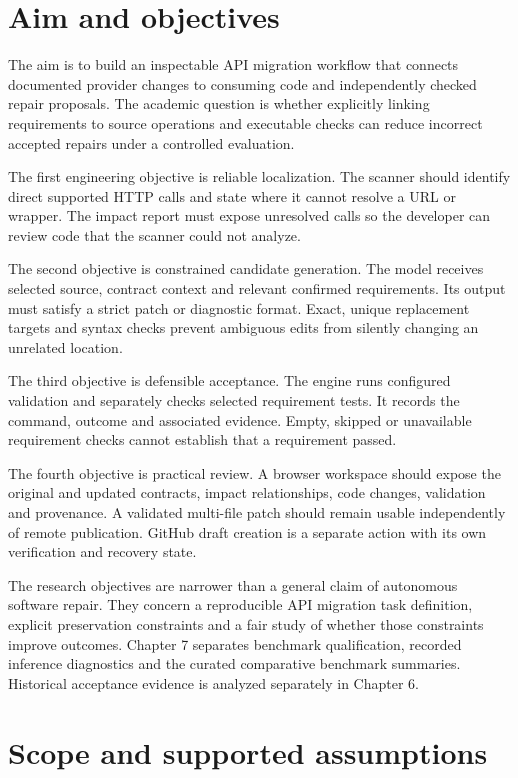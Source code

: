 \documentclass[12pt,a4paper,oneside]{report}
\begin{document}
\section{Aim and objectives}

The aim is to build an inspectable API migration workflow that connects documented provider changes to consuming code and independently checked repair proposals. The academic question is whether explicitly linking requirements to source operations and executable checks can reduce incorrect accepted repairs under a controlled evaluation.

The first engineering objective is reliable localization. The scanner should identify direct supported HTTP calls and state where it cannot resolve a URL or wrapper. The impact report must expose unresolved calls so the developer can review code that the scanner could not analyze.

The second objective is constrained candidate generation. The model receives selected source, contract context and relevant confirmed requirements. Its output must satisfy a strict patch or diagnostic format. Exact, unique replacement targets and syntax checks prevent ambiguous edits from silently changing an unrelated location.

The third objective is defensible acceptance. The engine runs configured validation and separately checks selected requirement tests. It records the command, outcome and associated evidence. Empty, skipped or unavailable requirement checks cannot establish that a requirement passed.

The fourth objective is practical review. A browser workspace should expose the original and updated contracts, impact relationships, code changes, validation and provenance. A validated multi-file patch should remain usable independently of remote publication. GitHub draft creation is a separate action with its own verification and recovery state.

The research objectives are narrower than a general claim of autonomous software repair. They concern a reproducible API migration task definition, explicit preservation constraints and a fair study of whether those constraints improve outcomes. Chapter 7 separates benchmark qualification, recorded inference diagnostics and the curated comparative benchmark summaries. Historical acceptance evidence is analyzed separately in Chapter 6.

\section{Scope and supported assumptions}
\end{document}
